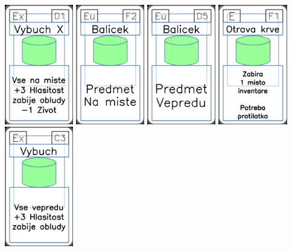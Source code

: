 \documentclass[a4paper]{article}
\begin{document}
	\includegraphics[width=3.0cm]{img-4_15}
	\includegraphics[width=3.0cm]{img-4_26}
	\includegraphics[width=3.0cm]{img-4_19}
	\includegraphics[width=3.0cm]{img-4_55}
	\includegraphics[width=3.0cm]{img-4_12}
\end{document}

